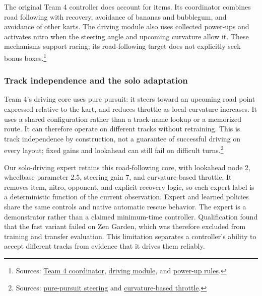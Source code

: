 The original Team 4 controller does account for items. Its coordinator combines
road following with recovery, avoidance of bananas and bubblegum, and avoidance
of other karts. The driving module also uses collected power-ups and activates
nitro when the steering angle and upcoming curvature allow it. These mechanisms
support racing; its road-following target does not explicitly seek bonus
boxes.\footnote{Sources:
\href{https://github.com/osigaud/pystk_project/blob/ddf2cb6573850f890bba26d4e5f82888d9dac82a/src/agents/team4/agent4.py}{Team 4 coordinator},
\href{https://github.com/osigaud/pystk_project/blob/ddf2cb6573850f890bba26d4e5f82888d9dac82a/src/agents/team4/AgentPilot.py}{driving module}, and
\href{https://github.com/osigaud/pystk_project/blob/ddf2cb6573850f890bba26d4e5f82888d9dac82a/src/agents/team4/AgentItems.py}{power-up rules}.}

\subsubsection{Track independence and the solo adaptation}

\qquad Team 4's driving core uses pure pursuit: it steers toward an upcoming
road point expressed relative to the kart, and reduces throttle as local
curvature increases. It uses a shared configuration rather than a track-name
lookup or a memorized route. It can therefore operate on different tracks
without retraining. This is track independence by construction, not a guarantee
of successful driving on every layout; fixed gains and lookahead can still
fail on difficult turns.\footnote{Sources:
\href{https://github.com/osigaud/pystk_project/blob/ddf2cb6573850f890bba26d4e5f82888d9dac82a/src/agents/team4/steering.py}{pure-pursuit steering} and
\href{https://github.com/osigaud/pystk_project/blob/ddf2cb6573850f890bba26d4e5f82888d9dac82a/src/agents/team4/speed.py}{curvature-based throttle}.}

\qquad Our solo-driving expert retains this road-following core, with lookahead
node 2, wheelbase parameter 2.5, steering gain 7, and curvature-based throttle.
It removes item, nitro, opponent, and explicit recovery logic, so each expert
label is a deterministic function of the current observation. Expert and learned
policies share the same controls and native automatic rescue behavior. The
expert is a demonstrator rather than a claimed minimum-time controller.
Qualification found that the fast variant failed on Zen Garden, which was
therefore excluded from training and transfer evaluation. This limitation
separates a controller's ability to accept different tracks from evidence that
it drives them reliably.

